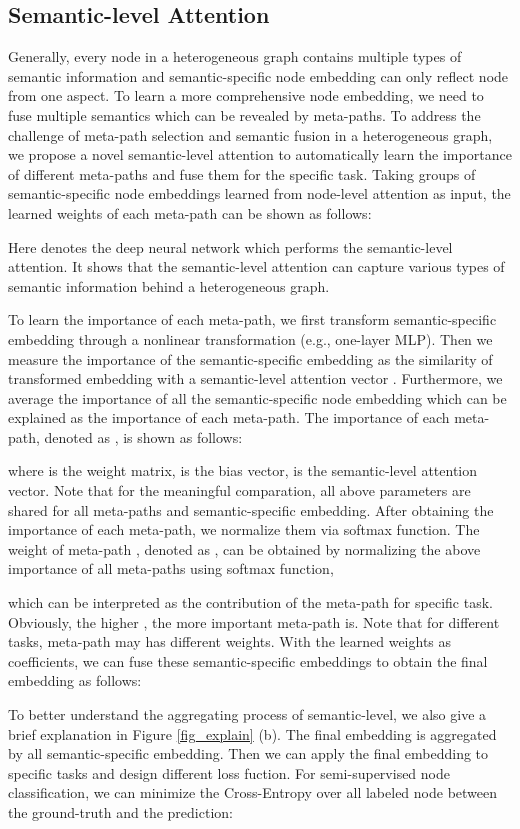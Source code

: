 \subsection{Semantic-level Attention}
Generally, every node in a heterogeneous graph contains multiple types of semantic information and semantic-specific node embedding can only reflect node
from one aspect.
To learn a more comprehensive node embedding, we need to
fuse multiple semantics which can be revealed by meta-paths. To address the challenge of meta-path selection and semantic fusion in a heterogeneous graph, we propose a novel semantic-level attention to 
automatically learn the importance of different meta-paths and fuse them for the specific task. 
Taking   groups of semantic-specific node embeddings learned from node-level attention as input, the learned weights of each meta-path  can be shown as follows:

Here  denotes the deep neural network which performs the semantic-level attention. 
It shows that the semantic-level attention can capture various types of semantic information behind a heterogeneous graph.

To learn the importance of each meta-path, we first transform semantic-specific embedding through a nonlinear transformation (e.g., one-layer MLP). Then we measure the importance of the semantic-specific embedding as the similarity of transformed embedding with a semantic-level attention vector . Furthermore, we average the importance of all the semantic-specific node embedding which can be explained as  the importance of each meta-path.
The importance of each meta-path, denoted as , is shown as follows:


where  is the weight matrix,   is the bias vector,  is the semantic-level attention vector. Note that for the meaningful comparation, all above parameters are shared for all meta-paths and semantic-specific embedding.
After obtaining the importance of each meta-path, we normalize them via softmax function. 
The weight of meta-path , denoted as  ,  can be obtained by normalizing the above importance of all meta-paths using softmax function,

which can be interpreted as the contribution of the meta-path  for specific task. Obviously, the higher , the more important meta-path  is. Note that for different tasks, meta-path  may has different weights.
With the learned weights as coefficients, 
we can fuse these semantic-specific embeddings to obtain the final embedding  as follows:	

To better understand the aggregating process of semantic-level, we also give a brief explanation in Figure \ref{fig_explain} (b). The final embedding is aggregated by all semantic-specific embedding.
Then we can apply the final embedding to specific tasks and design different loss fuction. 
For semi-supervised node classification, we can minimize the Cross-Entropy over all labeled node between the ground-truth and the prediction:

